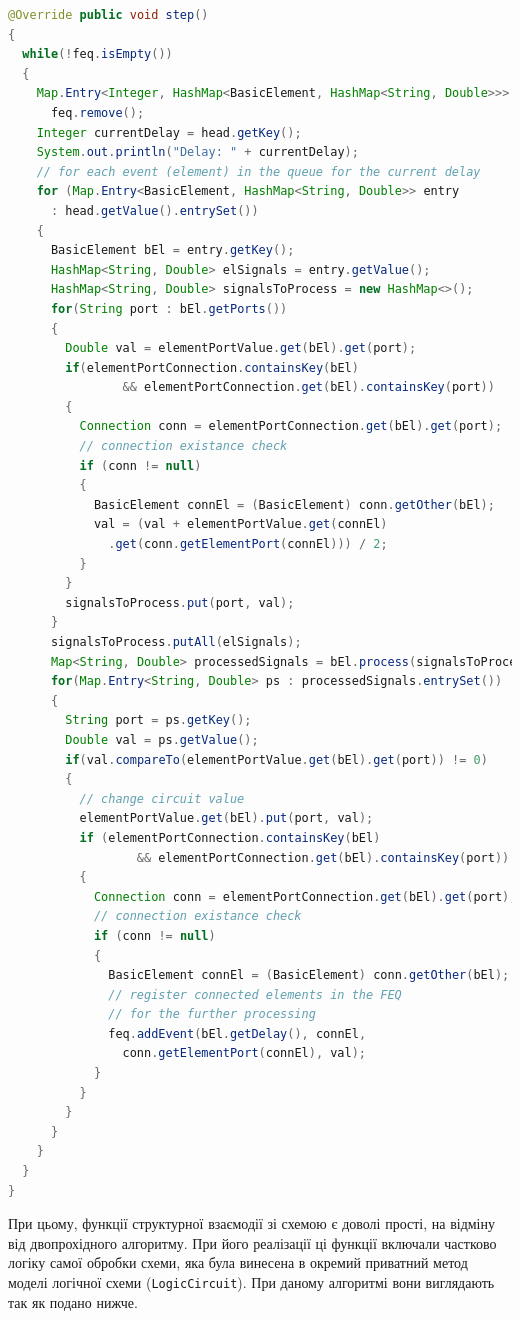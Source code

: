 \documentclass[12pt,a4paper]{article}
\begin{document}
\begin{lstlisting}[language=Java]
@Override public void step()
{
  while(!feq.isEmpty())
  {
    Map.Entry<Integer, HashMap<BasicElement, HashMap<String, Double>>> head =
      feq.remove();
    Integer currentDelay = head.getKey();
    System.out.println("Delay: " + currentDelay);
    // for each event (element) in the queue for the current delay
    for (Map.Entry<BasicElement, HashMap<String, Double>> entry
      : head.getValue().entrySet())
    {
      BasicElement bEl = entry.getKey();
      HashMap<String, Double> elSignals = entry.getValue();
      HashMap<String, Double> signalsToProcess = new HashMap<>();
      for(String port : bEl.getPorts())
      {
        Double val = elementPortValue.get(bEl).get(port);
        if(elementPortConnection.containsKey(bEl)
                && elementPortConnection.get(bEl).containsKey(port))
        {
          Connection conn = elementPortConnection.get(bEl).get(port);
          // connection existance check
          if (conn != null)
          {
            BasicElement connEl = (BasicElement) conn.getOther(bEl);
            val = (val + elementPortValue.get(connEl)
              .get(conn.getElementPort(connEl))) / 2;
          }
        }
        signalsToProcess.put(port, val);
      }
      signalsToProcess.putAll(elSignals);
      Map<String, Double> processedSignals = bEl.process(signalsToProcess);
      for(Map.Entry<String, Double> ps : processedSignals.entrySet())
      {
        String port = ps.getKey();
        Double val = ps.getValue();
        if(val.compareTo(elementPortValue.get(bEl).get(port)) != 0)
        {
          // change circuit value
          elementPortValue.get(bEl).put(port, val);
          if (elementPortConnection.containsKey(bEl)
                  && elementPortConnection.get(bEl).containsKey(port))
          {
            Connection conn = elementPortConnection.get(bEl).get(port);
            // connection existance check
            if (conn != null)
            {
              BasicElement connEl = (BasicElement) conn.getOther(bEl);
              // register connected elements in the FEQ
              // for the further processing
              feq.addEvent(bEl.getDelay(), connEl,
                conn.getElementPort(connEl), val);
            }
          }
        }
      }
    }
  }
}
\end{lstlisting}

При цьому, функції структурної взаємодії зі схемою є доволі прості, на відміну від двопрохідного алгоритму. При його реалізації ці функції включали частково логіку самої обробки схеми, яка була винесена в окремий приватний метод моделі логічної схеми (\lstinline$LogicCircuit$). При даному алгоритмі вони виглядають так як подано нижче.
\end{document}
